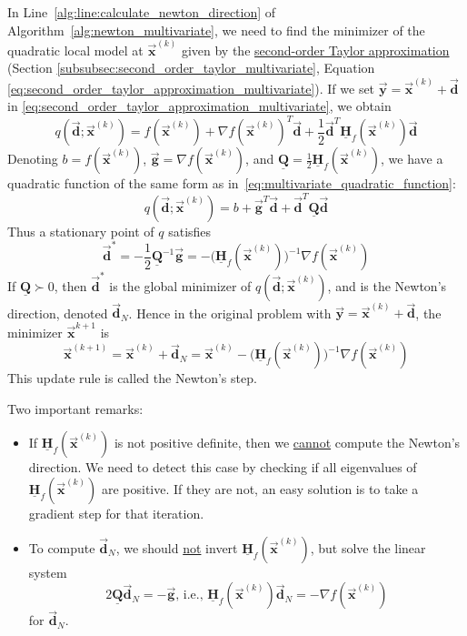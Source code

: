 \documentclass[9pt, headings=standardclasses, parskip=half]{scrartcl}
\renewcommand{\emph}[1]{\textcolor{mypurple}{#1}}
\newcommand{\matr}[1]{\underline{\boldsymbol{#1}}}
\newcommand{\vect}[1]{\vec{\boldsymbol{#1}}}
\begin{document}
In Line~\ref{alg:line:calculate_newton_direction} of Algorithm~\ref{alg:newton_multivariate}, we need to find the minimizer of the quadratic local model at \(\vect{x}^{(k)}\) given by the \hyperref[eq:second_order_taylor_approximation_multivariate]{second-order Taylor approximation} (Section \ref{subsubsec:second_order_taylor_multivariate}, Equation \ref{eq:second_order_taylor_approximation_multivariate}).
If we set \(\vect{y} = \vect{x}^{(k)} + \vect{d}\) in \eqref{eq:second_order_taylor_approximation_multivariate}, we obtain
\[
q(\vect{d};\vect{x}^{(k)}) = f(\vect{x}^{(k)}) + \nabla f(\vect{x}^{(k)})^{T}\vect{d} + \frac{1}{2}\vect{d}^{T}\matr{H}_{f}(\vect{x}^{(k)})\vect{d} %
\]
Denoting \(b = f(\vect{x}^{(k)})\), \(\vect{g} = \nabla f(\vect{x}^{(k)})\), and \(\matr{Q} = \frac{1}{2}\matr{H}_{f}(\vect{x}^{(k)})\), we have a quadratic function of the same form as in~\eqref{eq:multivariate_quadratic_function}:
\[
q(\vect{d};\vect{x}^{(k)}) = b + \vect{g}^{T}\vect{d} + \vect{d}^{T}\matr{Q}\vect{d} %
\]
Thus a stationary point of \(q\) satisfies
\[
\vect{d}^{*} = -\frac{1}{2}\matr{Q}^{-1}\vect{g} = -\big(\matr{H}_{f}(\vect{x}^{(k)})\big)^{-1} \nabla f(\vect{x}^{(k)}) %
\]
If \(\matr{Q} \succ 0\), then \(\vect{d}^{*}\) is the global minimizer of \(q(\vect{d};\vect{x}^{(k)})\), and is the \emph{Newton's direction}, denoted \(\vect{d}_{N}\).
Hence in the original problem with \(\vect{y} = \vect{x}^{(k)} + \vect{d}\), the minimizer \(\vect{x}^{k+1}\) is
\[
\vect{x}^{(k+1)} = \vect{x}^{(k)} + \vect{d}_{N} = \vect{x}^{(k)} - \big(\matr{H}_{f}(\vect{x}^{(k)})\big)^{-1} \nabla f(\vect{x}^{(k)}) %
\]
This update rule is called the \emph{Newton's step}.
\begin{caution} Two important remarks:
\begin{itemize}
\item If \(\matr{H}_{f}(\vect{x}^{(k)})\) is not positive definite, then we \underline{cannot} compute the Newton's direction.
We need to detect this case by checking if all eigenvalues of \(\matr{H}_{f}(\vect{x}^{(k)})\) are positive.
If they are not, an easy solution is to take a gradient step for that iteration.
\item To compute \(\vect{d}_{N}\), we should \underline{not} invert \(\matr{H}_{f}(\vect{x}^{(k)})\), but solve the linear system 
\[
2\matr{Q}\vect{d}_{N} = -\vect{g} \text{, i.e., }\matr{H}_{f}(\vect{x}^{(k)})\vect{d}_{N} = -\nabla f(\vect{x}^{(k)})
\]
for \(\vect{d}_{N}\).\qedhere
\end{itemize}
\end{caution}
\end{document}
